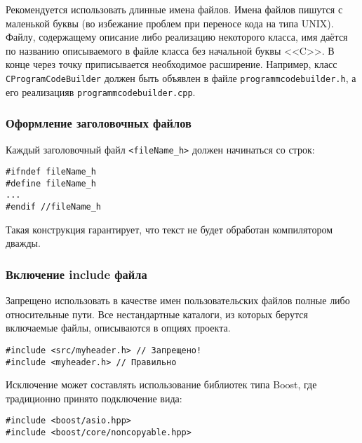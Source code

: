 Рекомендуется использовать длинные имена файлов. Имена файлов пишутся с маленькой буквы (во избежание проблем при переносе кода на  типа UNIX). Файлу, содержащему описание либо реализацию некоторого класса, имя даётся по названию описываемого в файле класса без начальной буквы <<C>>. В конце через точку приписывается необходимое расширение. Например, класс \lstinline|CProgramCodeBuilder| должен быть объявлен в файле \lstinline|programmcodebuilder.h|, а его реализация\mdash в \lstinline|programmcodebuilder.cpp|.

\subsubsection{Оформление заголовочных файлов}

Каждый заголовочный файл \lstinline|<fileName_h>| должен начинаться со строк: 

\begin{lstlisting}[frame=single,numbers=none]
#ifndef fileName_h
#define fileName_h
...
#endif //fileName_h
\end{lstlisting}

Такая конструкция гарантирует, что текст не будет обработан компилятором дважды.

\subsubsection{Включение include файла}

Запрещено использовать в качестве имен пользовательских файлов полные либо относительные пути. Все нестандартные каталоги, из которых берутся включаемые файлы, описываются в опциях проекта.

\begin{lstlisting}[frame=single,numbers=none]
#include <src/myheader.h> // Запрещено!
#include <myheader.h> // Правильно
\end{lstlisting}

Исключение может составлять использование библиотек типа Boost, где традиционно принято подключение вида:

\begin{lstlisting}[frame=single,numbers=none]
#include <boost/asio.hpp>
#include <boost/core/noncopyable.hpp>
\end{lstlisting}

